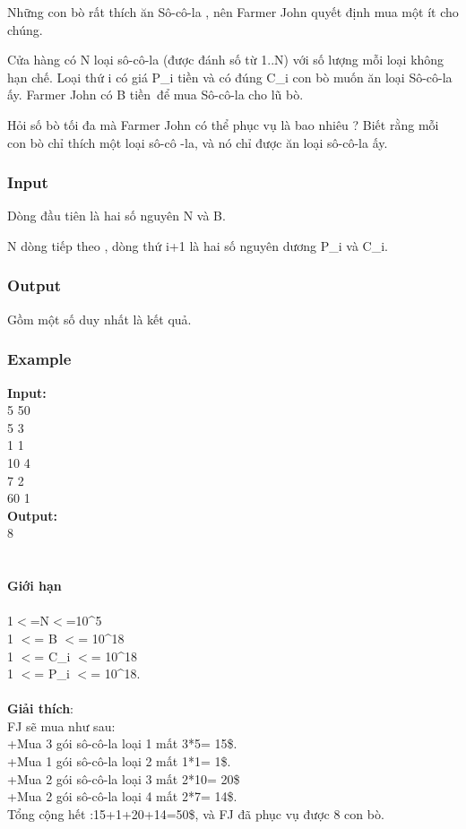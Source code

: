 

Những con bò rất thích ăn Sô-cô-la , nên Farmer John quyết định mua một ít cho chúng.

Cửa hàng có N loại sô-cô-la (được đánh số từ 1..N) với số lượng mỗi loại không hạn chế. Loại thứ i có giá P\_i tiền và có đúng C\_i con bò muốn ăn loại Sô-cô-la ấy. Farmer John có B tiền để mua Sô-cô-la cho lũ bò.

Hỏi số bò tối đa mà Farmer John có thể phục vụ là bao nhiêu ? Biết rằng mỗi con bò chỉ thích một loại sô-cô -la, và nó chỉ được ăn loại sô-cô-la ấy.

\subsubsection{Input}

Dòng đầu tiên là hai số nguyên N và B.

N dòng tiếp theo , dòng thứ i+1 là hai số nguyên dương P\_i và C\_i.

\subsubsection{Output}

Gồm một số duy nhất là kết quả.

\subsubsection{Example}

\textbf{Input:}
\\5 50
\\5 3
\\1 1
\\10 4
\\7 2
\\60 1
\\\textbf{Output:}
\\8
\\
\\
\\\textbf{​Giới hạn}
\\
\\1$<$=N$<$=10\textasciicircum5
\\1 $<$= B $<$= 10\textasciicircum18
\\1 $<$= C\_i $<$= 10\textasciicircum18
\\1 $<$= P\_i $<$= 10\textasciicircum18.
\\
\\\textbf{Giải thích}:
\\FJ sẽ mua như sau:
\\+Mua 3 gói sô-cô-la loại 1 mất 3*5= 15\$.
\\+Mua 1 gói sô-cô-la loại 2 mất 1*1= 1\$.
\\+Mua 2 gói sô-cô-la loại 3 mất 2*10= 20\$
\\+Mua 2 gói sô-cô-la loại 4 mất 2*7= 14\$.
\\Tổng cộng hết :15+1+20+14=50\$, và FJ đã phục vụ được 8 con bò.

 

 